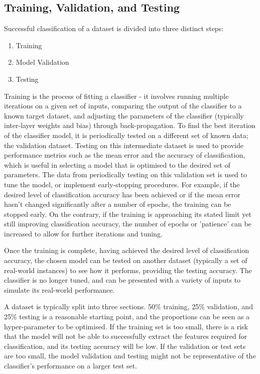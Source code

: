 \subsection{Training, Validation, and Testing}\label{lit:loocv}
Successful classification of a dataset is divided into three distinct steps:
\begin{enumerate}
	\item Training
	\item Model Validation
	\item Testing
\end{enumerate}

Training is the process of fitting a classifier - it involves running multiple iterations on a given set of inputs, comparing the output of the classifier to a known target dataset, and adjusting the parameters of the classifier (typically inter-layer weights and bias) through back-propagation. To find the best iteration of the classifier model, it is periodically tested on a different set of known data; the validation dataset. Testing on this intermediate dataset is used to provide performance metrics such as the mean error and the accuracy of classification, which is useful in selecting a model that is optimised to the desired set of parameters. The data from periodically testing on this validation set is used to tune the model, or implement early-stopping procedures. For example, if the desired level of classification accuracy has been achieved or if the mean error hasn't changed significantly after a number of epochs, the training can be stopped early. On the contrary, if the training is approaching its stated limit yet still improving classification accuracy, the number of epochs or 'patience' can be increased to allow for further iterations and tuning.

Once the training is complete, having achieved the desired level of classification accuracy, the chosen model can be tested on another dataset (typically a  set of real-world instances) to see how it performs, providing the testing accuracy. The classifier is no longer tuned, and can be presented with a variety of inputs to simulate its real-world performance.

A dataset is typically split into three sections. 50\% training, 25\% validation, and 25\% testing is a reasonable starting point, and the proportions can be seen as a hyper-parameter to be optimised. If the training set is too small, there is a risk that the model will not be able to successfully extract the features required for classification, and its testing accuracy will be low. If the validation or test sets are too small, the model validation and testing might not be representative of the classifier's performance on a larger test set.

